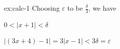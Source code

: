 
\begin{solution}{ex:calc-1}
  Choosing $\varepsilon$ to be $\frac{\delta}{3}$, 
  we have

  $0 < \vert x+1\vert < \delta $

  $\vert (3x+4) - 1 \vert = 3\vert x-1 \vert < 3\delta = \varepsilon$



\end{solution}
